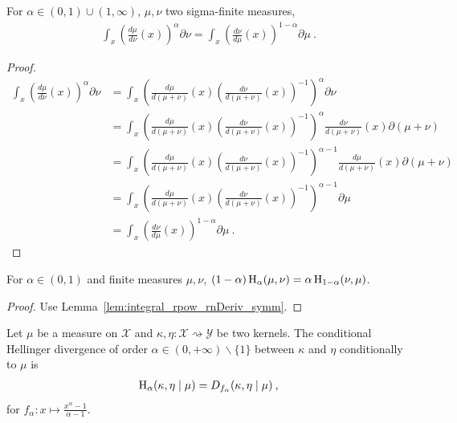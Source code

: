 \begin{lemma}
  \label{lem:integral_rpow_rnDeriv_symm}
  \leanok
  \uses{}
  For $\alpha \in (0,1)\cup(1, \infty)$, $\mu, \nu$ two sigma-finite measures,
  \begin{align*}
  \int_x \left(\frac{d \mu}{d \nu}(x)\right)^\alpha \partial \nu
  = \int_x \left(\frac{d \nu}{d \mu}(x)\right)^{1 - \alpha} \partial \mu
  \: .
  \end{align*}
\end{lemma}

\begin{proof}\leanok
\uses{}
\begin{align*}
  \int_x \left(\frac{d \mu}{d \nu}(x)\right)^\alpha \partial \nu
  &= \int_x \left(\frac{d \mu}{d (\mu + \nu)}(x) \left(\frac{d \nu}{d (\mu + \nu)}(x)\right)^{-1} \right)^\alpha \partial \nu \\
  &= \int_x \left(\frac{d \mu}{d (\mu + \nu)}(x) \left(\frac{d \nu}{d (\mu + \nu)}(x)\right)^{-1} \right)^\alpha \frac{d \nu}{d (\mu + \nu)}(x) \partial (\mu + \nu) \\
  &= \int_x \left(\frac{d \mu}{d (\mu + \nu)}(x) \left(\frac{d \nu}{d (\mu + \nu)}(x)\right)^{-1} \right)^{\alpha - 1} \frac{d \mu}{d (\mu + \nu)}(x) \partial (\mu + \nu) \\
  &= \int_x \left(\frac{d \mu}{d (\mu + \nu)}(x) \left(\frac{d \nu}{d (\mu + \nu)}(x)\right)^{-1} \right)^{\alpha - 1} \partial \mu \\
  &= \int_x \left(\frac{d \nu}{d \mu}(x)\right)^{1 - \alpha} \partial \mu
  \: .
  \end{align*}
\end{proof}


\begin{lemma}
  \label{lem:hellingerAlpha_symm}
  \leanok
  For $\alpha \in (0, 1)$ and finite measures $\mu, \nu$, $(1 - \alpha) \operatorname{H}_\alpha(\mu, \nu) = \alpha \operatorname{H}_{1 - \alpha}(\nu, \mu)$.
\end{lemma}

\begin{proof}\leanok
{}
Use Lemma~\ref{lem:integral_rpow_rnDeriv_symm}.
\end{proof}


\begin{definition}
  \label{def:condHellingerAlpha}
  \leanok
  Let $\mu$ be a measure on $\mathcal X$ and $\kappa, \eta : \mathcal X \rightsquigarrow \mathcal Y$ be two kernels. The conditional Hellinger divergence of order $\alpha \in (0,+\infty) \backslash \{1\}$ between $\kappa$ and $\eta$ conditionally to $\mu$ is
  \begin{align*}
  \operatorname{H}_\alpha(\kappa, \eta \mid \mu) = D_{f_\alpha}(\kappa, \eta \mid \mu) \: ,
  \end{align*}
  for $f_\alpha : x \mapsto \frac{x^{\alpha} - 1}{\alpha - 1}$.
\end{definition}



